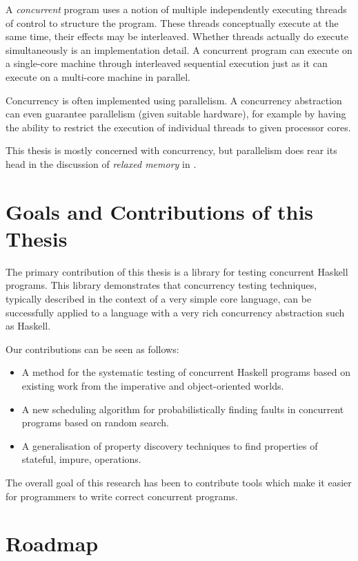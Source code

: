 A \emph{concurrent} program uses a notion of multiple independently executing
threads of control to structure the program.  These threads conceptually execute
at the same time, their effects may be interleaved.  Whether threads actually do
execute simultaneously is an implementation detail.  A concurrent program can
execute on a single-core machine through interleaved sequential execution just
as it can execute on a multi-core machine in parallel.

Concurrency is often implemented using parallelism.  A concurrency abstraction
can even guarantee parallelism (given suitable hardware), for example by having
the ability to restrict the execution of individual threads to given processor
cores.

This thesis is mostly concerned with concurrency, but parallelism does rear its
head in the discussion of \emph{relaxed memory} in .

\section{Goals and Contributions of this Thesis}
\label{sec:intro-contributions}

The primary contribution of this thesis is a library for testing concurrent
Haskell programs.  This library demonstrates that concurrency testing
techniques, typically described in the context of a very simple core language,
can be successfully applied to a language with a very rich concurrency
abstraction such as Haskell.

Our contributions can be seen as follows:

\begin{itemize}
\item A method for the systematic testing of concurrent Haskell programs based
on existing work from the imperative and object-oriented worlds.
\item A new scheduling algorithm for probabilistically finding faults in concurrent
programs based on random search.
\item A generalisation of property discovery techniques to find properties of
stateful, impure, operations.
\end{itemize}

The overall goal of this research has been to contribute tools which make it
easier for programmers to write correct concurrent programs.

\section{Roadmap}
\label{sec:intro-roadmap}

